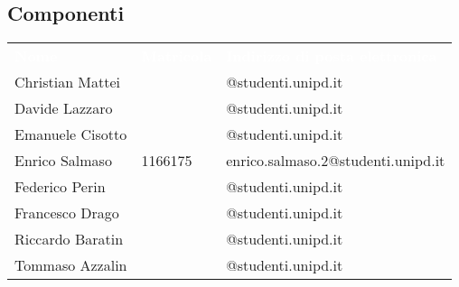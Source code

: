 \subsection{Componenti}
{
	\renewcommand{\arraystretch}{2}
	\centering
	\begin{longtable}{ C{4cm} C{2cm} C{8cm} }
		\textcolor{white}{\textbf{Nome}} & \textcolor{white}{\textbf{Matricola}} & \textcolor{white}{\textbf{Indirizzo di posta elettronica}}\\	
		
		
		Christian Mattei & & @studenti.unipd.it \\
		Davide Lazzaro & & @studenti.unipd.it\\
		Emanuele Cisotto & & @studenti.unipd.it\\
		Enrico Salmaso & 1166175 & enrico.salmaso.2@studenti.unipd.it \\
		Federico Perin & & @studenti.unipd.it \\
		Francesco Drago & & @studenti.unipd.it \\
		Riccardo Baratin & & @studenti.unipd.it \\
		Tommaso Azzalin & & @studenti.unipd.it \\
		
		
	\end{longtable}
}